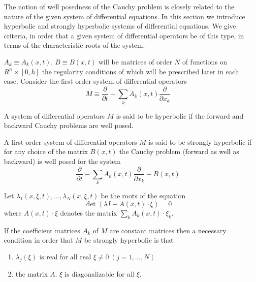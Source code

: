 The notion of well posedness of the Cauchy problem is closely related
to the nature of the given system of differential equations. In this
section we introduce hyperbolic and strongly hyperbolic systems of
differential equations. We give criteria,  in order that a given
system of differential operators be of this type, in terms of the
characteristic roots of the system.  

$A_k \equiv A_k(x, t)$, $B \equiv B (x, t) $ will be matrices of order
$N$ of functions on $\underbar{R}^n \times [0, h]$ the regularity
conditions of which will be prescribed later in each case. Consider
the first order system of  differential operators  
\begin{equation}
M \equiv \frac{\partial}{\partial t} - \sum\limits_{k} A_k(x, t)
\frac{\partial}{\partial x_k} \tag{5.1}\label{chap2-eq5.1} 
 \end{equation}\pageoriginale 

\begin{defi*}
A system of differential operators $M$ is said to be hyperbolic if the
forward and backward Cauchy problems are well posed.  
\end{defi*}

\begin{defi*}
A first order system of differential operators $M$ is said to be
strongly hyperbolic if for any choice of the matrix $B(x, t)$ the
Cauchy problem (forward as well as backward) is well posed for the
system  
\begin{equation}
\frac{\partial}{\partial t}- \sum \limits_{k}A_k (x, t)
\frac{\partial}{\partial x_k} - B(x, t)  \tag{5.2}\label{chap2-eq5.2} 
 \end{equation} 
 
 
 Let $\lambda_1 (x,\xi, t), \ldots, \lambda_N (x,\xi,t)$ be the roots of the
 equation 
 \begin{equation}
\det (\lambda I - A(x, t) \cdot  \xi ) = 0  \tag{5.3}\label{chap2-eq5.3}
 \end{equation} 
 where $A(x, t)\cdot \xi$ denotes the matrix $\sum\limits_k A_k (x,
 t) \cdot \xi_k$.  
\end{defi*}

\setcounter{proposition}{0}
 \begin{proposition}\label{chap2-sec5-prop1}%
 If the coefficient matrices $A_k$ of $M$ are constant matrices then a
 necessary condition in order that $M$ be strongly hyperbolic is that  
 \begin{enumerate}[\rm(1)]
\item $\lambda_j(\xi)$ is real for all real $\xi \neq 0\ (j = 1,
  \ldots, N)$ 

\item the matrix $A$. $\xi$ is diagonalizable for all $\xi$. 
\end{enumerate} 
 \end{proposition}

